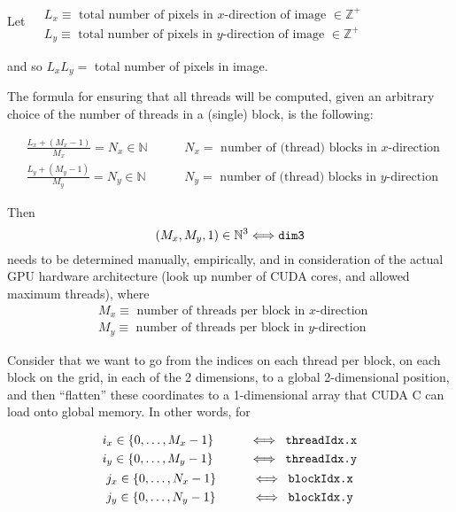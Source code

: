 \documentclass[10pt]{amsart}
\begin{document}
\begin{multicols*}{2}
Let $\begin{aligned} & \quad \\
  & L_x \equiv \text{ total number of pixels in $x$-direction of image } \in \mathbb{Z}^+ \\
   & L_y \equiv \text{ total number of pixels in $y$-direction of image } \in \mathbb{Z}^+ \end{aligned}$

and so $L_x L_y  = $ total number of pixels in image.

The formula for ensuring that all threads will be computed, given an arbitrary choice of the number of threads in a (single) block, is the following:

\[
\begin{aligned}
  & \frac{L_x + ( M_x - 1) }{ M_x} = N_x \in \mathbb{N} \qquad \, & N_x = \text{ number of (thread) blocks in $x$-direction } \\ 
  & \frac{L_y + ( M_y - 1) }{ M_y} = N_y \in \mathbb{N} \qquad \, & N_y = \text{ number of (thread) blocks in $y$-direction } 
\end{aligned}
\]

Then
\[
(M_x, M_y, 1) \in \mathbb{N}^3  \Longleftrightarrow \verb|dim3|
\]
needs to be determined manually, empirically, and in consideration of the actual GPU hardware architecture (look up number of CUDA cores, and allowed maximum threads), where
\[
\begin{aligned}
  & M_x \equiv \text{ number of threads per block in $x$-direction } \\ 
  & M_y \equiv \text{ number of threads per block in $y$-direction } 
  \end{aligned}
\]

Consider that we want to go from the indices on each thread per block, on each block on the grid, in each of the 2 dimensions, to a global 2-dimensional position, and then ``flatten'' these coordinates to a 1-dimensional array that CUDA C can load onto global memory.  In other words, for

\[
\begin{gathered}
\begin{aligned}  
  & i_x \in \lbrace 0 , \dots , M_x - 1 \rbrace \qquad \, & \Longleftrightarrow \verb| threadIdx.x| \\ 
  & i_y \in \lbrace 0 , \dots , M_y - 1 \rbrace \qquad \, & \Longleftrightarrow \verb| threadIdx.y|
  \end{aligned} \\ 
\begin{aligned}
  & j_x \in \lbrace 0 , \dots , N_x - 1 \rbrace \qquad \, & \Longleftrightarrow \verb| blockIdx.x| \\ 
  & j_y \in \lbrace 0 , \dots , N_y - 1 \rbrace \qquad \, & \Longleftrightarrow \verb| blockIdx.y|
  \end{aligned}
\end{gathered}
\]


\end{multicols*}
\end{document}

